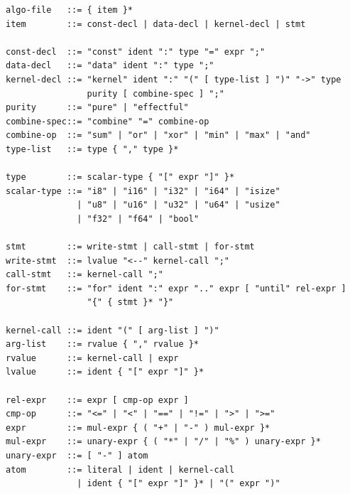 \begin{verbatim}
algo-file   ::= { item }*
item        ::= const-decl | data-decl | kernel-decl | stmt

const-decl  ::= "const" ident ":" type "=" expr ";"
data-decl   ::= "data" ident ":" type ";"
kernel-decl ::= "kernel" ident ":" "(" [ type-list ] ")" "->" type
                purity [ combine-spec ] ";"
purity      ::= "pure" | "effectful"
combine-spec::= "combine" "=" combine-op
combine-op  ::= "sum" | "or" | "xor" | "min" | "max" | "and"
type-list   ::= type { "," type }*

type        ::= scalar-type { "[" expr "]" }*
scalar-type ::= "i8" | "i16" | "i32" | "i64" | "isize"
              | "u8" | "u16" | "u32" | "u64" | "usize"
              | "f32" | "f64" | "bool"

stmt        ::= write-stmt | call-stmt | for-stmt
write-stmt  ::= lvalue "<--" kernel-call ";"
call-stmt   ::= kernel-call ";"
for-stmt    ::= "for" ident ":" expr ".." expr [ "until" rel-expr ]
                "{" { stmt }* "}"

kernel-call ::= ident "(" [ arg-list ] ")"
arg-list    ::= rvalue { "," rvalue }*
rvalue      ::= kernel-call | expr
lvalue      ::= ident { "[" expr "]" }*

rel-expr    ::= expr [ cmp-op expr ]
cmp-op      ::= "<=" | "<" | "==" | "!=" | ">" | ">="
expr        ::= mul-expr { ( "+" | "-" ) mul-expr }*
mul-expr    ::= unary-expr { ( "*" | "/" | "%" ) unary-expr }*
unary-expr  ::= [ "-" ] atom
atom        ::= literal | ident | kernel-call
              | ident { "[" expr "]" }* | "(" expr ")"
\end{verbatim}

